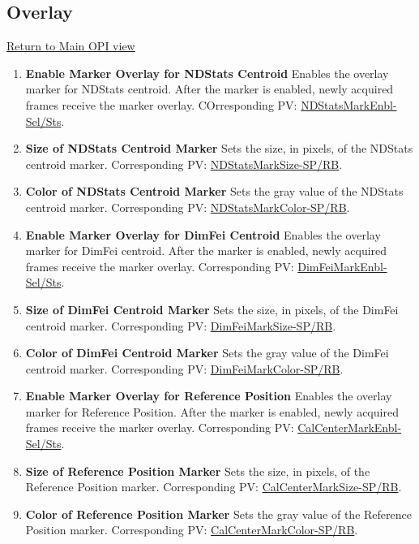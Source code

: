 \documentclass[openany]{article}
\begin{document}
    \subsection{Overlay}\label{sec:overlay}

        \hyperref[fig:opi-main]{Return to Main OPI view}

        \begin{enumerate}
            \item \textbf{Enable Marker Overlay for NDStats Centroid} Enables the overlay marker for NDStats centroid. After the marker is enabled, newly acquired frames receive the marker overlay. COrresponding PV: \hyperlink{pv:ndstats-mark-enbl}{NDStatsMarkEnbl-Sel/Sts}.
            \item \textbf{Size of NDStats Centroid Marker} Sets the size, in pixels, of the NDStats centroid marker. Corresponding PV: \hyperlink{pv:ndstats-mark-size}{NDStatsMarkSize-SP/RB}.
            \item \textbf{Color of NDStats Centroid Marker} Sets the gray value of the NDStats centroid marker. Corresponding PV: \hyperlink{pv:ndstats-mark-color}{NDStatsMarkColor-SP/RB}.
            \item \textbf{Enable Marker Overlay for DimFei Centroid} Enables the overlay marker for DimFei centroid. After the marker is enabled, newly acquired frames receive the marker overlay. Corresponding PV: \hyperlink{pv:dimfei-mark-enbl}{DimFeiMarkEnbl-Sel/Sts}.
            \item \textbf{Size of DimFei Centroid Marker} Sets the size, in pixels, of the DimFei centroid marker. Corresponding PV: \hyperlink{pv:dimfei-mark-size}{DimFeiMarkSize-SP/RB}.
            \item \textbf{Color of DimFei Centroid Marker} Sets the gray value of the DimFei centroid marker. Corresponding PV: \hyperlink{pv:dimfei-mark-color}{DimFeiMarkColor-SP/RB}.
            \item \textbf{Enable Marker Overlay for Reference Position} Enables the overlay marker for Reference Position. After the marker is enabled, newly acquired frames receive the marker overlay. Corresponding PV: \hyperlink{pv:cal-center-mark-enbl}{CalCenterMarkEnbl-Sel/Sts}.
            \item \textbf{Size of Reference Position Marker} Sets the size, in pixels, of the Reference Position marker. Corresponding PV: \hyperlink{pv:cal-center-mark-size}{CalCenterMarkSize-SP/RB}.
            \item \textbf{Color of Reference Position Marker} Sets the gray value of the Reference Position marker. Corresponding PV: \hyperlink{pv:cal-center-mark-color}{CalCenterMarkColor-SP/RB}.

\end{enumerate}
\end{document}
